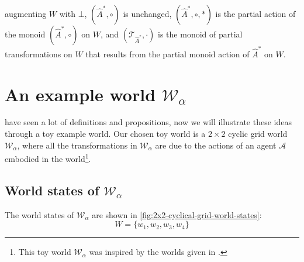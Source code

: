  augmenting $W$ with $\bot$, $(\hat{A}^{*}, \circ)$ is unchanged, $(\hat{A}^{*}, \circ, \ast)$ is the partial action of the monoid $(\hat{A}^{*}, \circ)$ on $W$, and $(\mathcal{T}_{\hat{A}^{*}}, \cdot)$ is the monoid of partial transformations on $W$ that results from the partial monoid action of $\hat{A}^{*}$ on $W$.


\section{
An example world \texorpdfstring{$\mathscr{W}_{\alpha}$}{}
 }\label{sec:an_example_world}

 have seen a lot of definitions and propositions, now we will illustrate these ideas through a toy example world.
Our chosen toy world is a $2\times 2$ cyclic grid world $\mathscr{W}_{\alpha}$, where all the transformations in $\mathscr{W}_{\alpha}$ are due to the actions of an agent $\mathscr{A}$ embodied in the world\footnote{
This toy world $\mathscr{W}_{\alpha}$ was inspired by the worlds given in \autocite{Higgins2018,caselles2019symmetry}.
}.


\subsection{
World states of $\mathscr{W}_{\alpha}$
}\label{sec:World states of example}

The world states of $\mathscr{W}_{\alpha}$ are shown in \cref{fig:2x2-cyclical-grid-world-states}:
\begin{equation}
    W = \{ w_{1}, w_{2}, w_{3}, w_{4} \}
\end{equation}

